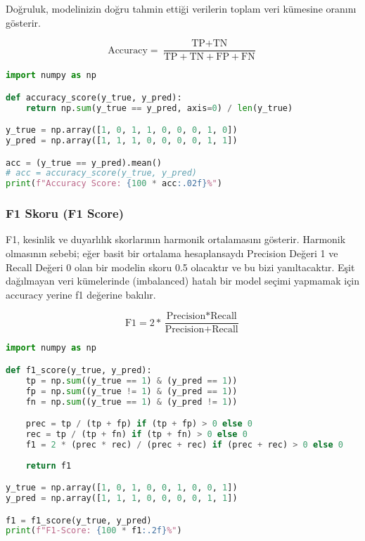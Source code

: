 Doğruluk, modelinizin doğru tahmin ettiği verilerin toplam veri kümesine oranını gösterir.

\[\text{Accuracy} = \frac{\text{TP} + \text{TN}}{\text{TP} + \text{TN} + \text{FP} + \text{FN}}\]

\begin{lstlisting}[language=Python]
import numpy as np

def accuracy_score(y_true, y_pred):
    return np.sum(y_true == y_pred, axis=0) / len(y_true)

y_true = np.array([1, 0, 1, 1, 0, 0, 0, 1, 0])
y_pred = np.array([1, 1, 1, 0, 0, 0, 0, 1, 1])

acc = (y_true == y_pred).mean()
# acc = accuracy_score(y_true, y_pred)
print(f"Accuracy Score: {100 * acc:.02f}%")
\end{lstlisting}

\newpage

\subsubsection{F1 Skoru (F1 Score)}

F1, kesinlik ve duyarlılık skorlarının harmonik ortalamasını gösterir. Harmonik olmasının sebebi; eğer basit bir ortalama hesaplansaydı Precision Değeri 1 ve Recall Değeri 0 olan bir modelin skoru 0.5 olacaktır ve bu bizi yanıltacaktır. Eşit dağılmayan veri kümelerinde (imbalanced) hatalı bir model seçimi yapmamak için accuracy yerine f1 değerine bakılır.

\[\text{F1} = 2 * \frac{\text{Precision} * \text{Recall}}{\text{Precision} + \text{Recall}}\]

\begin{lstlisting}[language=Python]
import numpy as np

def f1_score(y_true, y_pred):
    tp = np.sum((y_true == 1) & (y_pred == 1))
    fp = np.sum((y_true != 1) & (y_pred == 1))
    fn = np.sum((y_true == 1) & (y_pred != 1))

    prec = tp / (tp + fp) if (tp + fp) > 0 else 0
    rec = tp / (tp + fn) if (tp + fn) > 0 else 0
    f1 = 2 * (prec * rec) / (prec + rec) if (prec + rec) > 0 else 0
    
    return f1

y_true = np.array([1, 0, 1, 0, 0, 1, 0, 0, 1])
y_pred = np.array([1, 1, 1, 0, 0, 0, 0, 1, 1])

f1 = f1_score(y_true, y_pred)
print(f"F1-Score: {100 * f1:.2f}%")
\end{lstlisting}

